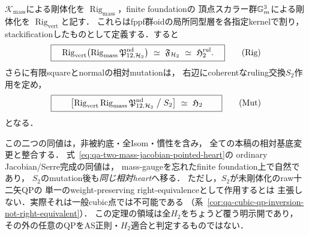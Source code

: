 \begin{theorem}
\label{thm:qa-two-mass-h2-rigidification-ruling-glue}
$\mathcal K_{\mathrm{mass}}$による剛体化を
$\operatorname{Rig}_{\mathrm{mass}}$，finite foundationの
頂点スカラー群$\mathbb G_m^3$による剛体化を
$\operatorname{Rig}_{\mathrm{vert}}$と記す．
これらはfppf群oidの局所同型層を各指定kernelで割り，
stackificationしたものとして定義する．すると
\[
 \boxed{\quad
 \operatorname{Rig}_{\mathrm{vert}}\!
   \left(\operatorname{Rig}_{\mathrm{mass}}
       \mathfrak P_{12,\mathcal H_2}^{\mathrm{nd}}\right)
 \ \simeq\ \mathfrak F_{\mathcal H_2}
 \ \simeq\ \mathfrak H_2^{\mathrm{rul}}.
 \quad}
 \tag{Rig}\label{eq:qa-two-mass-h2-double-rigidification}
\]
さらに有限squareとnormalの相対mutationは，
右辺にcoherentなruling交換$S_2$作用を定め，
\[
 \boxed{\qquad
  \left[
   \operatorname{Rig}_{\mathrm{vert}}
    \operatorname{Rig}_{\mathrm{mass}}
       \mathfrak P_{12,\mathcal H_2}^{\mathrm{nd}}
     \bigm/ S_2
  \right]\ \simeq\ \mathfrak H_2
 \qquad}
 \tag{Mut}\label{eq:qa-two-mass-mutation-h2-quotient}
\]
となる．

この二つの同値は，非被約底・全Isom・慣性を含み，
全ての本稿の相対基底変更と整合する．
式~\eqref{eq:qa-two-mass-jacobian-pointed-heart}の
ordinary Jacobian/Serre完成の同値は，
mass-gaugeを忘れたfinite foundation上で自然であり，
$S_2$のmutation後も\emph{同じ相対heart}へ移る．
ただし，$S_2$が未剛体化のraw十二矢QPの
単一のweight-preserving right-equivalenceとして作用するとは
主張しない．実際それは一般cubic点では不可能である
（系~\ref{cor:qa-cubic-qp-inversion-not-right-equivalent}）．
この定理の領域は全$H_2$をちょうど覆う明示開であり，
その外の任意のQPをAS正則・$H_2$適合と判定するものではない．
\end{theorem}
